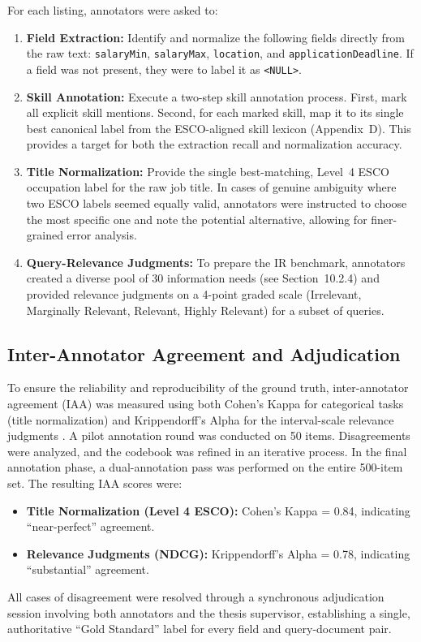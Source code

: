 For each listing, annotators were asked to:
\begin{enumerate}
    \item \textbf{Field Extraction:} Identify and normalize the following fields directly from the raw text: \texttt{salaryMin}, \texttt{salaryMax}, \texttt{location}, and \texttt{applicationDeadline}. If a field was not present, they were to label it as \texttt{<NULL>}.
    \item \textbf{Skill Annotation:} Execute a two-step skill annotation process. First, mark all explicit skill mentions. Second, for each marked skill, map it to its single best canonical label from the ESCO-aligned skill lexicon (Appendix~D). This provides a target for both the extraction recall and normalization accuracy.
    \item \textbf{Title Normalization:} Provide the single best-matching, Level~4 ESCO occupation label for the raw job title. In cases of genuine ambiguity where two ESCO labels seemed equally valid, annotators were instructed to choose the most specific one and note the potential alternative, allowing for finer-grained error analysis.
    \item \textbf{Query-Relevance Judgments:} To prepare the IR benchmark, annotators created a diverse pool of 30 information needs (see Section~10.2.4) and provided relevance judgments on a 4-point graded scale (Irrelevant, Marginally Relevant, Relevant, Highly Relevant) for a subset of queries.
\end{enumerate}

\subsection{Inter-Annotator Agreement and Adjudication}
To ensure the reliability and reproducibility of the ground truth, inter-annotator agreement (IAA) was measured using both Cohen's Kappa for categorical tasks (title normalization) and Krippendorff's Alpha for the interval-scale relevance judgments \cite{jurafsky2023speech}. A pilot annotation round was conducted on 50 items. Disagreements were analyzed, and the codebook was refined in an iterative process. In the final annotation phase, a dual-annotation pass was performed on the entire 500-item set. The resulting IAA scores were:
\begin{itemize}
    \item \textbf{Title Normalization (Level 4 ESCO):} Cohen's Kappa = 0.84, indicating ``near-perfect'' agreement.
    \item \textbf{Relevance Judgments (NDCG):} Krippendorff's Alpha = 0.78, indicating ``substantial'' agreement.
\end{itemize}
All cases of disagreement were resolved through a synchronous adjudication session involving both annotators and the thesis supervisor, establishing a single, authoritative ``Gold Standard'' label for every field and query-document pair.

